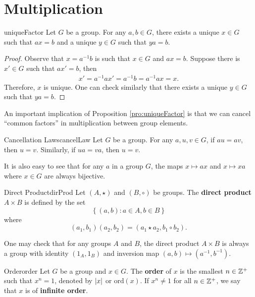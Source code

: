 \documentclass[math, code]{amznotes}
\theoremstyle{remark}
\begin{document}
\section{Multiplication}
\begin{probox}{}{uniqueFactor}
    Let $G$ be a group. For any $a, b \in G$, there exists a unique $x \in G$ such that $ax = b$ and a unique $y \in G$ such that $ya = b$.
    \tcblower
    \begin{proof}
        Observe that $x = a^{-1}b$ is such that $x \in G$ and $ax = b$. Suppose there is $x' \in G$ such that $ax' = b$, then
        \begin{align*}
            x' = a^{-1}ax' = a^{-1}b = a^{-1}ax = x.
        \end{align*}
        Therefore, $x$ is unique. One can check similarly that there exists a unique $y \in G$ such that $ya = b$.
    \end{proof}
\end{probox}
An important implication of Proposition \ref{pro:uniqueFactor} is that we can cancel ``common factors'' in multiplication between group elements.
\begin{corbox}{Cancellation Laws}{cancelLaw}
    Let $G$ be a group. For any $a, u, v \in G$, if $au = av$, then $u = v$. Similarly, if $ua = va$, then $u = v$.
\end{corbox}
It is also easy to see that for any $a$ in a group $G$, the maps $x \mapsto ax$ and $x \mapsto xa$ where $x \in G$ are always bijective.
\begin{dfnbox}{Direct Product}{dirProd}
    Let $(A, \star)$ and $(B, \circ)$ be groups. The {\color{red} \textbf{direct product}} $A \times B$ is defined by the set
    \begin{equation*}
        \left\{(a, b) \colon a \in A, b \in B\right\}
    \end{equation*}
    where
    \begin{equation*}
        (a_1, b_1)(a_2, b_2) = (a_1 \star a_2, b_1 \circ b_2).
    \end{equation*}
\end{dfnbox}
One may check that for  any groups $A$ and $B$, the direct product $A \times B$ is always a group with identity $(1_A, 1_B)$ and inversion map $(a, b) \mapsto (a^{-1}, b^{-1})$.
\begin{dfnbox}{Order}{order}
    Let $G$ be a group and $x \in G$. The {\color{red} \textbf{order}} of $x$ is the smallest $n \in \mathbb{Z}^+$ such that $x^n = 1$, denoted by ${\left\lvert {x} \right\rvert}$ or $\mathrm{ord}(x)$. If $x^n \neq 1$ for all $n \in \mathbb{Z}^+$, we say that $x$ is of {\color{red} \textbf{infinite order}}.
\end{dfnbox}
\end{document}
